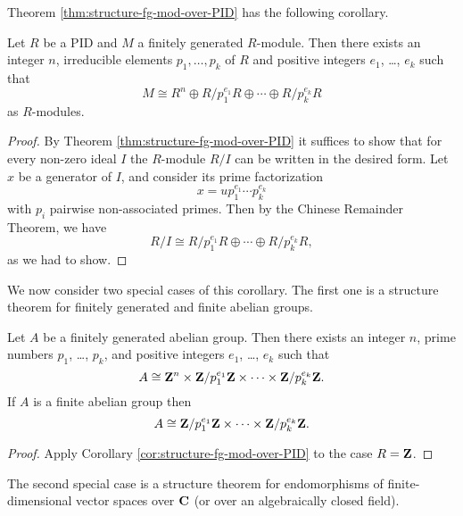 Theorem \ref{thm:structure-fg-mod-over-PID} has the following corollary.

\begin{corollary}\label{cor:structure-fg-mod-over-PID}
Let $R$ be a PID and $M$  a finitely generated $R$-module. Then there exists an integer $n$, irreducible elements $p_1,\ldots,p_k$ of $R$ and positive integers $e_1$, \ldots, $e_k$ such that
\[
	M \cong R^n \oplus R/p_1^{e_1}R \oplus \cdots \oplus R/p_k^{e_k}R
\]
as $R$-modules.
\end{corollary}

\begin{proof}
By Theorem \ref{thm:structure-fg-mod-over-PID} it suffices to show that for every non-zero ideal $I$  the $R$-module $R/I$ can be written in the desired form. Let $x$ be a generator of $I$, and consider its prime factorization
\[	
	x = u p_1^{e_1} \cdots p_k^{e_k}
\]
with $p_i$ pairwise non-associated primes. Then by the Chinese Remainder Theorem, we have
\[
	R/I \cong R/p_1^{e_1}R \oplus \cdots \oplus R/p_k^{e_k}R,
\]
as we had to show.
\end{proof}

We now consider two special cases of this corollary. The first one is a structure theorem for finitely generated and finite abelian groups.

\begin{theorem}
Let $A$ be a finitely generated abelian group. Then there exists an integer $n$, prime numbers 
$p_1$, \ldots, $p_k$, and positive integers $e_1$, \ldots, $e_k$ such that 
\[
	A \cong {\mathbf{Z}}^{n} \times {\mathbf{Z}}/{p_1^{e_1}}{\mathbf{Z}} \times \cdots \times {\mathbf{Z}}/{p_k^{e_k}}{\mathbf{Z}}.
\]
If $A$ is a finite abelian group then 
\[
	A \cong {\mathbf{Z}}/{p_1^{e_1}}{\mathbf{Z}} \times \cdots \times {\mathbf{Z}}/{p_k^{e_k}}{\mathbf{Z}}.
\]
\end{theorem}

\begin{proof}
Apply Corollary \ref{cor:structure-fg-mod-over-PID} to the case $R={\mathbf{Z}}$.
\end{proof}

The second special case is a structure theorem for endomorphisms of finite-dimensional vector spaces over ${\mathbf{C}}$ (or over an algebraically closed field). 

